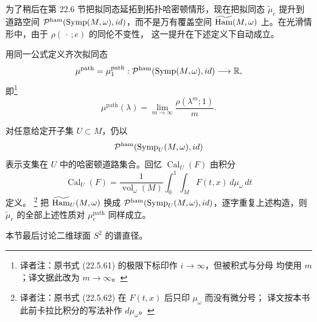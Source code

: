 为了稍后在第 22.6 节把拟同态延拓到拓扑哈密顿情形，现在把拟同态
$\widetilde\mu_e$ 提升到道路空间
$\mathcal P^{\mathrm{ham}}(\operatorname{Symp}(M,\omega),id)$，而不是万有覆盖空间
$\widetilde{\operatorname{Ham}}(M,\omega)$ 上。在光滑情形中，由于 $\rho(\,\cdot\,;e)$ 的同伦不变性，
这一提升在下述定义下自动成立。

\begin{definition}
\label{def:22-path-homogeneous-quasimorphism}
用同一公式定义齐次拟同态
\[
 \mu^{\mathrm{path}}=\mu_1^{\mathrm{path}}:
 \mathcal P^{\mathrm{ham}}(\operatorname{Symp}(M,\omega),id)\longrightarrow\mathbb R,
\]
即\footnote{译者注：原书式 (22.5.61) 的极限下标印作 $i\to\infty$，但被积式与分母
均使用 $m$；译文据此改为 $m\to\infty$。}
\begin{equation}
 \mu^{\mathrm{path}}(\lambda)
 =\lim_{m\to\infty}\frac{\rho(\lambda^m;1)}m.
 \label{eq:22-path-homogeneous-quasimorphism}
\end{equation}
\end{definition}

对任意给定开子集 $U\subset M$，仍以
\[
 \mathcal P^{\mathrm{ham}}(\operatorname{Symp}_U(M,\omega),id)
\]
表示支集在 $U$ 中的哈密顿道路集合。回忆
$\operatorname{Cal}_U(F)$ 由积分
\begin{equation}
 \operatorname{Cal}_U(F)
 =\frac1{\operatorname{vol}_\omega(M)}\int_0^1\int_MF(t,x)\,d\mu_\omega\,dt
 \label{eq:22-calabi-integral}
\end{equation}
定义。
\footnote{译者注：原书式 (22.5.62) 在 $F(t,x)$ 后只印 $\mu_\omega$ 而没有微分号；
译文按本书此前卡拉比积分的写法补作 $d\mu_\omega$。}
把 $\widetilde{\operatorname{Ham}}_U(M,\omega)$ 换成
$\mathcal P^{\mathrm{ham}}(\operatorname{Symp}_U(M,\omega),id)$，逐字重复上述构造，则
$\widetilde\mu_e$ 的全部上述性质对 $\mu_e^{\mathrm{path}}$ 同样成立。

本节最后讨论二维球面 $S^2$ 的谱直径。

